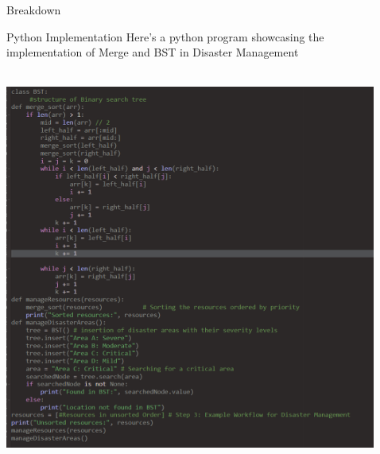 \documentclass[final]{beamer}
\newlength{\sepwidth}
\newlength{\colwidth}
\newcommand{\separatorcolumn}{\begin{column}{\sepwidth}\end{column}}
\begin{document}
\begin{frame}[t]
\begin{columns}[t]
\begin{column}{\colwidth}
\begin{block}{Breakdown}
                    
                \end{block}
                \begin{block}{Python Implementation}
                    Here's a python program showcasing the implementation of Merge and BST in Disaster Management\\
                    \phantom{This text will be invisible}\\
                    \centerline{\includegraphics[width=.96\linewidth]{apply}}
                    \phantom{This text will be invisible}\\
                    
                \end{block}
    		\end{column}
    		\separatorcolumn
    		\begin{column}{\colwidth}
    		

\end{column}
\end{columns}
\end{frame}
\end{document}
